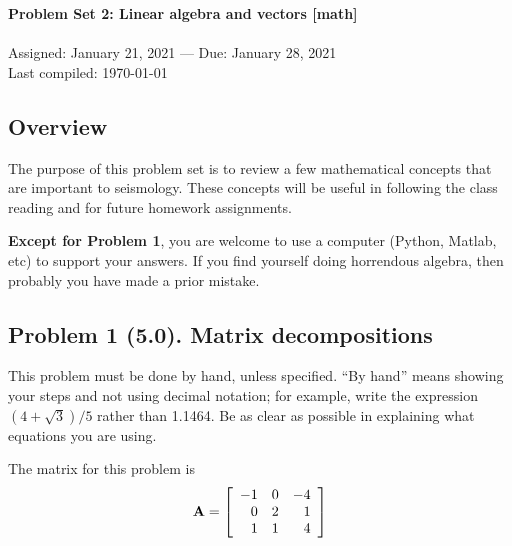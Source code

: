 \documentclass[11pt,titlepage,fleqn]{article}
\begin{document}

\begin{spacing}{1.2}
\centering
{\large \bf Problem Set 2: Linear algebra and vectors [math]} \\
\cltag\ \\
Assigned: January 21, 2021 --- Due: January 28, 2021 \\
Last compiled: \today \\
\end{spacing}


\subsection*{Overview}

The purpose of this problem set is to review a few mathematical concepts that are important to seismology. These concepts will be useful in following the class reading \citep{SteinWysession,ShearerE2} and for future homework assignments.

{\bf Except for Problem 1}, you are welcome to use a computer (Python, Matlab, etc) to support your answers. If you find yourself doing horrendous algebra, then probably you have made a prior mistake.


\subsection*{Problem 1 (5.0). Matrix decompositions}

This problem must be done by hand, unless specified. ``By hand'' means showing your steps and not using decimal notation; for example, write the expression $(4 +\sqrt{3})/5$ rather than 1.1464.
Be as clear as possible in explaining what equations you are using.

\medskip\noindent
The matrix for this problem is
%
\begin{equation*}
\mbox{${\bf A}$} =  \left[ \begin{array}{rrr}
    -1  &   0  &  -4 \\
     0  &   2  &   1 \\
     1  &   1  &   4 \\
\end{array} \right]
\end{equation*}
\end{document}
